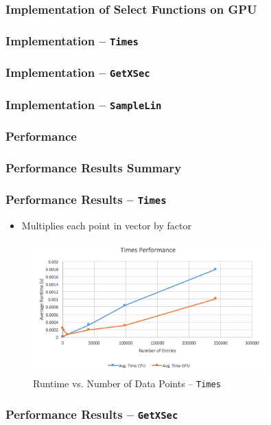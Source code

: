 \documentclass{beamer}
\begin{document}
\subsubsection{Implementation of Select Functions on GPU}
\begin{frame}
\frametitle{Implementation -- \texttt{Times}}
\end{frame}

\begin{frame}
\frametitle{Implementation -- \texttt{GetXSec}}
\end{frame}

\begin{frame}
\frametitle{Implementation -- \texttt{SampleLin}}
\end{frame}

\subsubsection{Performance}
\begin{frame}
\frametitle{Performance Results Summary}
\end{frame}

\begin{frame}
\frametitle{Performance Results -- \texttt{Times}}
\begin{itemize}
\item Multiplies each point in vector by factor
\end{itemize}
\begin{figure}
\centering
\includegraphics[width=0.8\textwidth]{images/times_line.png}
\caption{Runtime vs. Number of Data Points -- \texttt{Times}}
\end{figure}
\end{frame}

\begin{frame}
\frametitle{Performance Results -- \texttt{GetXSec}}
\end{frame}
\end{document}
